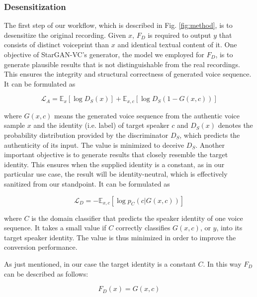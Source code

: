 \documentclass[journal]{IEEEtran} %
\begin{document}
\subsubsection{Desensitization}

The first step of our workflow, which is described in Fig. \ref{fig:method}, is to desensitize the original recording. Given $x$, $F_D$ is required to output $y$ that consists of distinct voiceprint than $x$ and identical textual content of it. One objective of StarGAN-VC\cite{a3}'s generator, the model we employed for $F_D$, is to generate plausible results that is not distinguishable from the real recordings. This ensures the integrity and structural correctness of generated voice sequence. It can be formulated as

\begin{equation}
    \label{eqn:adv_loss}
    \mathcal{L}_A = \mathbb{E}_{x}[\log D_S(x)] + \mathbb{E}_{x, c}[\log D_S(1 - G(x, c))]
\end{equation}

where $G(x, c)$ means the generated voice sequence from the authentic voice sample $x$ and the identity (i.e. label) of target speaker $c$ and $D_S(x)$ denotes the probability distribution provided by the discriminator $D_S$, which predicts the authenticity of its input. The value is minimized to deceive $D_S$. Another important objective is to generate results that closely resemble the target identity. This ensures when the supplied identity is a constant, as in our particular use case, the result will be identity-neutral, which is effectively sanitized from our standpoint. It can be formulated as

\begin{equation}
    \label{eqn:dom_loss}
    \mathcal{L}_D = - \mathbb{E}_{x, c}[\log p_C(c | G(x, c))]
\end{equation}

where $C$ is the domain classifier that predicts the speaker identity of one voice sequence. It takes a small value if $C$ correctly classifies $G(x, c)$, or $y$, into its target speaker identity. The value is thus minimized in order to improve the conversion performance.

As just mentioned, in our case the target identity is a constant $C$. In this way $F_D$ can be described as follows:

\begin{equation}
    \label{eqn:fd_val}
    F_D(x) = G(x, c)
\end{equation}
\end{document}
